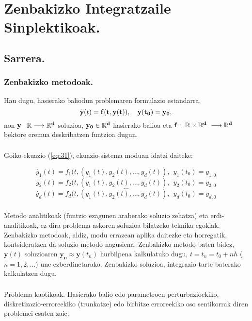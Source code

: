 \chapter{Zenbakizko Integratzaile Sinplektikoak.}

\section{Sarrera.}

\subsection{Zenbakizko metodoak.}

Hau dugu, hasierako baliodun problemaren formulazio estandarra,
\begin{equation}
\label{eq:31}
\dot{\bf{y}}(t)=\bf{f}(t,\bf{y}(t)),\ \ \ \bf{y}(t_0)=\bf{y_0},
\end{equation}
non $\bf{y}: \mathbb{R} \longrightarrow {\mathbb{R}}^d$ soluzioa, $\bf{y_0} \in \mathbb{R}^d$ hasierako balioa eta $\bf{f}: \ \mathbb{R} \times {\mathbb{R}}^d \ \longrightarrow {\mathbb{R}}^d$ bektore eremua deskribatzen funtzioa dugun.

\paragraph*{}Goiko ekuazio (\ref{eq:31}), ekuazio-sistema moduan idatzi daiteke:

\[\dot{y_1}(t)=f_1(t,(y_1(t),y_2(t),\dots,y_d(t)), \ \ y_1(t_0)=y_{1,0}\]
\[\dot{y_2}(t)=f_2(t,(y_1(t),y_2(t),\dots,y_d(t)), \ \ y_2(t_0)=y_{2,0}\]
\[\dots\]
\[\dot{y_d}(t)=f_d(t,(y_1(t),y_2(t),\dots,y_d(t)),  \ \ y_d(t_0)=y_{d,0}\]

\paragraph*{} Metodo analitikoak (funtzio ezagunen araberako soluzio zehatza) eta erdi-analitikoak, ez dira problema askoren soluzioa bilatzeko teknika egokiak. Zenbakizko metodoak, aldiz, modu errazean aplika daitezke eta horregatik, kontsideratzen da soluzio metodo nagusiena. Zenbakizko metodo baten bidez, $\mathbf{y}(t)$ soluzioaren $\mathbf{y_n} \approx \mathbf{y}(t_n)$ hurbilpena kalkulatuko dugu, $t=t_n=t_0+nh$ ($n=1,2,\dots$) une ezberdinetarako. Zenbakizko soluzioa, integrazio tarte baterako kalkulatzen dugu.

\paragraph*{} Problema kaotikoak. Hasierako balio edo parametroen perturbazioekiko, diskretizazio-erroreekiko (trunkatze) edo birbitze erroreekiko oso sentikorrak diren problemei esaten zaie.
 
